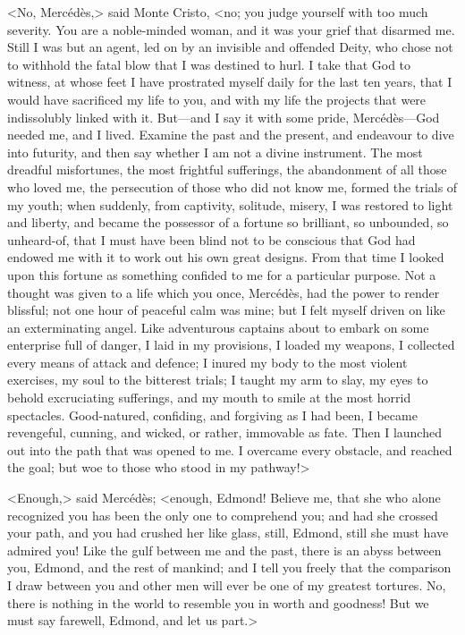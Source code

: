  <No, Mercédès,> said Monte Cristo, <no; you judge yourself with too much severity. You are a noble-minded woman, and it was your grief that disarmed me. Still I was but an agent, led on by an invisible and offended Deity, who chose not to withhold the fatal blow that I was destined to hurl. I take that God to witness, at whose feet I have prostrated myself daily for the last ten years, that I would have sacrificed my life to you, and with my life the projects that were indissolubly linked with it. But—and I say it with some pride, Mercédès—God needed me, and I lived. Examine the past and the present, and endeavour to dive into futurity, and then say whether I am not a divine instrument. The most dreadful misfortunes, the most frightful sufferings, the abandonment of all those who loved me, the persecution of those who did not know me, formed the trials of my youth; when suddenly, from captivity, solitude, misery, I was restored to light and liberty, and became the possessor of a fortune so brilliant, so unbounded, so unheard-of, that I must have been blind not to be conscious that God had endowed me with it to work out his own great designs. From that time I looked upon this fortune as something confided to me for a particular purpose. Not a thought was given to a life which you once, Mercédès, had the power to render blissful; not one hour of peaceful calm was mine; but I felt myself driven on like an exterminating angel. Like adventurous captains about to embark on some enterprise full of danger, I laid in my provisions, I loaded my weapons, I collected every means of attack and defence; I inured my body to the most violent exercises, my soul to the bitterest trials; I taught my arm to slay, my eyes to behold excruciating sufferings, and my mouth to smile at the most horrid spectacles. Good-natured, confiding, and forgiving as I had been, I became revengeful, cunning, and wicked, or rather, immovable as fate. Then I launched out into the path that was opened to me. I overcame every obstacle, and reached the goal; but woe to those who stood in my pathway!>

<Enough,> said Mercédès; <enough, Edmond! Believe me, that she who alone recognized you has been the only one to comprehend you; and had she crossed your path, and you had crushed her like glass, still, Edmond, still she must have admired you! Like the gulf between me and the past, there is an abyss between you, Edmond, and the rest of mankind; and I tell you freely that the comparison I draw between you and other men will ever be one of my greatest tortures. No, there is nothing in the world to resemble you in worth and goodness! But we must say farewell, Edmond, and let us part.> 


